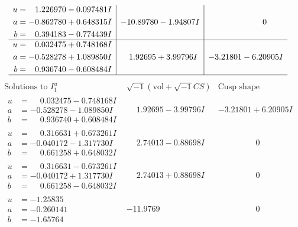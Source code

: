 \documentclass[1p]{elsarticle_modified}
\theoremstyle{definition}
\newcommand{\I}{\sqrt{-1}}
\begin{document}
$$\begin{array}{c|c|c}
\begin{aligned}
u &= \phantom{-}1.226970 - 0.097481 I \\
a &= -0.862780 + 0.648315 I \\
b &= \phantom{-}0.394183 - 0.774439 I\end{aligned}
 & -10.89780 - 1.94807 I & \phantom{-0.000000 } 0 \\ \hline\begin{aligned}
u &= \phantom{-}0.032475 + 0.748168 I \\
a &= -0.528278 + 1.089850 I \\
b &= \phantom{-}0.936740 - 0.608484 I\end{aligned}
 & \phantom{-}1.92695 + 3.99796 I & -3.21801 - 6.20905 I\\
 \hline 
 \end{array}$$\newpage$$\begin{array}{c|c|c}  
\text{Solutions to }I^u_{1}& \I (\text{vol} + \sqrt{-1}CS) & \text{Cusp shape}\\
 \hline 
\begin{aligned}
u &= \phantom{-}0.032475 - 0.748168 I \\
a &= -0.528278 - 1.089850 I \\
b &= \phantom{-}0.936740 + 0.608484 I\end{aligned}
 & \phantom{-}1.92695 - 3.99796 I & -3.21801 + 6.20905 I \\ \hline\begin{aligned}
u &= \phantom{-}0.316631 + 0.673261 I \\
a &= -0.040172 - 1.317730 I \\
b &= \phantom{-}0.661258 + 0.648032 I\end{aligned}
 & \phantom{-}2.74013 - 0.88698 I & \phantom{-0.000000 } 0 \\ \hline\begin{aligned}
u &= \phantom{-}0.316631 - 0.673261 I \\
a &= -0.040172 + 1.317730 I \\
b &= \phantom{-}0.661258 - 0.648032 I\end{aligned}
 & \phantom{-}2.74013 + 0.88698 I & \phantom{-0.000000 } 0 \\ \hline\begin{aligned}
u &= -1.25835\phantom{ +0.000000I} \\
a &= -0.260141\phantom{ +0.000000I} \\
b &= -1.65764\phantom{ +0.000000I}\end{aligned}
 & -11.9769\phantom{ +0.000000I} & \phantom{-0.000000 } 0 \\ \hline\begin{aligned}

\end{aligned}
\end{array}$$
\end{document}
